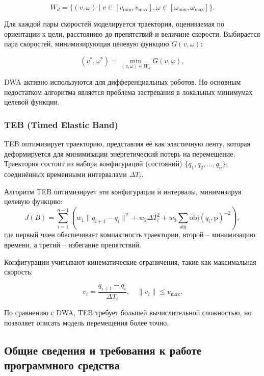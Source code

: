 {\begin{equation}
W_d = \{ (v, \omega) \mid v \in [v_{\min}, v_{\max}],	\omega \in [\omega_{\min}, \omega_{\max}] \}.
\end{equation}

Для каждой пары скоростей моделируется траектория,
оцениваемая по ориентации к цели, расстоянию до препятствий и величине скорости.
Выбирается пара скоростей, минимизирующая целевую функцию $G(v, \omega)$:

\begin{equation}
(v^*, \omega^*) = \min_{(v, \omega) \in W_d} G(v, \omega),
\end{equation}

DWA активно используются для дифференциальных роботов. Но основным недостатком алгоритма
является проблема застревания в локальных минимумах целевой функции.

\subsubsection{TEB (Timed Elastic Band)}

TEB оптимизирует траекторию, представляя её как эластичную ленту,
которая деформируется для минимизации энергетический потерь на перемещение.
Траектория состоит из набора конфигураций (состояний) $\{q_1, q_2, \dots, q_n\}$, 
соединённых временными интервалами $\Delta T_i$. 

Алгоритм TEB оптимизирует эти конфигурации и интервалы, минимизируя целевую функцию:
\begin{equation}
	J(B) = \sum_{i=1}^{n-1} \left( w_1 \| q_{i+1} - q_i \|^2 + w_2 \Delta T_i^2 + w_3 \sum_{\text{obj}} \text{obj}(q_i, \text{p})^{-2} \right),
\end{equation}
где первый член обеспечивает компактность траектории, 
второй -- минимизацию времени, 
а третий -- избегание препятствий.

Конфигурации учитывают кинематические ограничения, такие как максимальная скорость:

\begin{equation}
v_i = \frac{q_{i+1} - q_i}{\Delta T_i}, \quad \| v_i \| \leq v_{\max}.
\end{equation}

По сравнению с DWA, TEB требует большей вычислительной сложностью,
но позволяет описать модель перемещения более точно. 

\subsection{Общие сведения и требования к работе программного средства}

}
